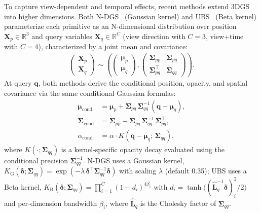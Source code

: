 \documentclass{article}
\theoremstyle{plain}
\theoremstyle{definition}
\theoremstyle{remark}
\begin{document}
To capture view-dependent and temporal effects, recent methods extend 3DGS into higher dimensions. Both N-DGS~\cite{gao20246dgs,gao20257dgs} (Gaussian kernel) and UBS~\citep{liu2025universal} (Beta kernel) parameterize each primitive as an N-dimensional distribution over position $\mathbf{X}_p \in \mathbb{R}^3$ and query variables $\mathbf{X}_q \in \mathbb{R}^C$ (view direction with $C=3$, view+time with $C=4$), characterized by a joint mean and covariance:
\begin{align}
\begin{pmatrix} \mathbf{X}_p \\ \mathbf{X}_q \end{pmatrix} \sim \left(
\begin{pmatrix}
\boldsymbol{\mu}_p \\ \boldsymbol{\mu}_q
\end{pmatrix},
\begin{pmatrix}
\boldsymbol{\Sigma}_{pp} & \boldsymbol{\Sigma}_{pq} \\
\boldsymbol{\Sigma}_{pq}^\top & \boldsymbol{\Sigma}_{qq}
\end{pmatrix}
\right).
\end{align}
At query $\mathbf{q}$, both methods derive the conditional position, opacity, and spatial covariance via the same conditional Gaussian formulas:
\begin{align}
\boldsymbol{\mu}_{\text{cond}} &= \boldsymbol{\mu}_p + \boldsymbol{\Sigma}_{pq}\,\boldsymbol{\Sigma}_{qq}^{-1}(\mathbf{q}-\boldsymbol{\mu}_q), \label{eq:prelim_mu}\\
\boldsymbol{\Sigma}_{\text{cond}} &= \boldsymbol{\Sigma}_{pp} - \boldsymbol{\Sigma}_{pq}\,\boldsymbol{\Sigma}_{qq}^{-1}\,\boldsymbol{\Sigma}_{pq}^\top, \label{eq:prelim_sigma}\\
\alpha_{\text{cond}} &= \alpha \cdot K\!\left(\mathbf{q}-\boldsymbol{\mu}_q;\,\boldsymbol{\Sigma}_{qq}\right), \label{eq:prelim_alpha}
\end{align}
where $K(\cdot;\boldsymbol{\Sigma}_{qq})$ is a kernel-specific opacity decay evaluated using the conditional precision $\boldsymbol{\Sigma}_{qq}^{-1}$. N-DGS uses a Gaussian kernel, $K_{\text{G}}(\boldsymbol{\delta};\boldsymbol{\Sigma}_{qq}) = \exp(-\lambda\,\boldsymbol{\delta}^\top \boldsymbol{\Sigma}_{qq}^{-1}\boldsymbol{\delta})$ with scaling $\lambda$ (default 0.35); UBS uses a Beta kernel, $K_{\text{B}}(\boldsymbol{\delta};\boldsymbol{\Sigma}_{qq}) = \prod_{i=1}^{C}(1-d_i)^{4\beta_i}$ with $d_i = \tanh\!\big((\hat{\mathbf{L}}_q^{-1}\boldsymbol{\delta})_i^2/2\big)$ and per-dimension bandwidth $\beta_i$, where $\hat{\mathbf{L}}_q$ is the Cholesky factor of $\boldsymbol{\Sigma}_{qq}$.
\end{document}

